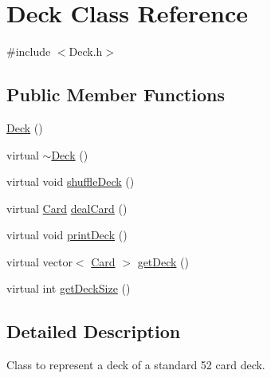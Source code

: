\hypertarget{class_deck}{\section{Deck Class Reference}
\label{class_deck}
}


{\ttfamily \#include $<$Deck.\-h$>$}

\subsection*{Public Member Functions}
\begin{DoxyCompactItemize}
\item 
\hyperlink{class_deck_a57ae1cb4ac6fd61c249cefb2db85eb99}{Deck} ()
\item 
virtual \hyperlink{class_deck_a0455563eccd460a9ff84e74b858beb30}{$\sim$\-Deck} ()
\item 
virtual void \hyperlink{class_deck_a7487a75ebb6b729a97b5250b101324b4}{shuffle\-Deck} ()
\item 
virtual \hyperlink{class_card}{Card} \hyperlink{class_deck_a621e5f6f80e45ee17176686833c3299c}{deal\-Card} ()
\item 
virtual void \hyperlink{class_deck_a2e8bef2632fd7c823218e83491a60abf}{print\-Deck} ()
\item 
virtual vector$<$ \hyperlink{class_card}{Card} $>$ \hyperlink{class_deck_a95171bc96437f86ce24aa0103eafcea6}{get\-Deck} ()
\item 
virtual int \hyperlink{class_deck_a43795439864d704d33feffd43d10adb7}{get\-Deck\-Size} ()
\end{DoxyCompactItemize}


\subsection{Detailed Description}
Class to represent a deck of a standard 52 card deck. 

